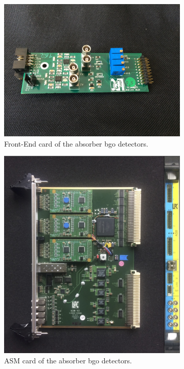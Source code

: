 \begin{figure}
\begin{subfigure}[b]{.5\textwidth}
\centering
\includegraphics[width=1.1\textwidth, angle = -90]{03_GraphicFiles/chapter3_CLaRySproto/Absorber/images/FEcard}
\caption{Front-End card of the absorber \gls{bgo} detectors.}
\label{chap3::fig::FEcard_mod} 
\end{subfigure}
\begin{subfigure}[b]{.5\textwidth}
\centering
\includegraphics[width=1\textwidth]{03_GraphicFiles/chapter3_CLaRySproto/Absorber/ASMcard.jpg}
\caption{ASM card of the absorber \gls{bgo} detectors.}
\label{chap3::fig::ASMcard} 
\end{subfigure}
\caption{}
\label{chap5::fig::AbsorberCards}
\end{figure}

